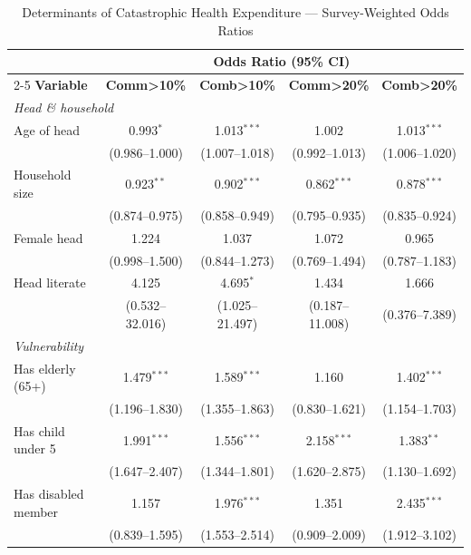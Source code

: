 \clearpage



\begin{table}[htbp]
\centering
\caption{Determinants of Catastrophic Health Expenditure --- Survey-Weighted Odds Ratios}
\label{tab:logit}
\footnotesize
\begin{tabular}{lcccc}
\hline\hline
 & \multicolumn{4}{c}{\textbf{Odds Ratio (95\% CI)}} \\
\cmidrule(lr){2-5}
\textbf{Variable} & \textbf{Comm>10\%} & \textbf{Comb>10\%} & \textbf{Comm>20\%} & \textbf{Comb>20\%} \\
\hline
\multicolumn{5}{l}{\textit{Head \& household}} \\
\quad Age of head & 0.993$^{*}$ & 1.013$^{***}$ & 1.002 & 1.013$^{***}$ \\
\quad & (0.986--1.000) & (1.007--1.018) & (0.992--1.013) & (1.006--1.020) \\
\quad Household size & 0.923$^{**}$ & 0.902$^{***}$ & 0.862$^{***}$ & 0.878$^{***}$ \\
\quad & (0.874--0.975) & (0.858--0.949) & (0.795--0.935) & (0.835--0.924) \\
\quad Female head & 1.224 & 1.037 & 1.072 & 0.965 \\
\quad & (0.998--1.500) & (0.844--1.273) & (0.769--1.494) & (0.787--1.183) \\
\quad Head literate & 4.125 & 4.695$^{*}$ & 1.434 & 1.666 \\
\quad & (0.532--32.016) & (1.025--21.497) & (0.187--11.008) & (0.376--7.389) \\

\multicolumn{5}{l}{\textit{Vulnerability}} \\
\quad Has elderly (65+) & 1.479$^{***}$ & 1.589$^{***}$ & 1.160 & 1.402$^{***}$ \\
\quad & (1.196--1.830) & (1.355--1.863) & (0.830--1.621) & (1.154--1.703) \\
\quad Has child under 5 & 1.991$^{***}$ & 1.556$^{***}$ & 2.158$^{***}$ & 1.383$^{**}$ \\
\quad & (1.647--2.407) & (1.344--1.801) & (1.620--2.875) & (1.130--1.692) \\
\quad Has disabled member & 1.157 & 1.976$^{***}$ & 1.351 & 2.435$^{***}$ \\
\quad & (0.839--1.595) & (1.553--2.514) & (0.909--2.009) & (1.912--3.102) \\


\end{tabular}
\end{table}
